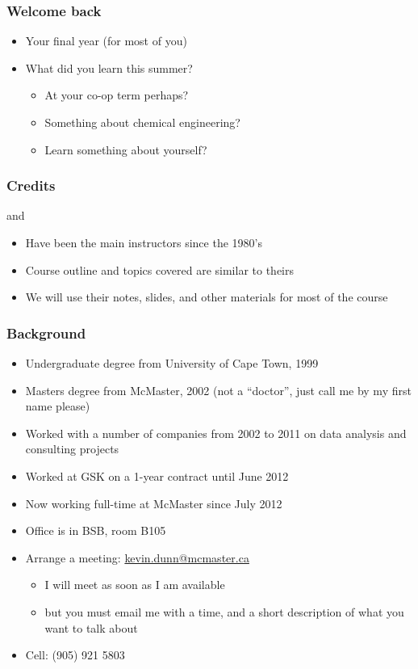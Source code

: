 
\begin{frame}\frametitle{Welcome back}
	\begin{itemize}
		\item	Your final year (for most of you)
		\item	What did you learn this summer?
			\begin{itemize}
				\item	At your co-op term perhaps?
				\item	Something about chemical engineering?
				\item	Learn something about yourself?
			\end{itemize}
	\end{itemize}
\end{frame}

\begin{frame}\frametitle{Credits}
	\begin{exampleblock}{}
		\centering {\color{myOrange}{Dr. Don Woods}} and {\color{myBlue}{Dr. Thomas Marlin}}
	\end{exampleblock}
	\begin{itemize}
		\item	Have been the main instructors since the 1980's
		\item	Course outline and topics covered are similar to theirs
		\item	We will use their notes, slides, and other materials for most of the course
	\end{itemize}
\end{frame}

\begin{frame}\frametitle{Background}
	{\color{myGreen}{About myself}}
	\begin{itemize}
		\item	Undergraduate degree from University of Cape Town, 1999
		\item	Masters degree from McMaster, 2002 (not a ``doctor'', just call me by my first name please)
		\item	Worked with a number of companies from 2002 to 2011 on data analysis and consulting projects
		\item	Worked at GSK on a 1-year contract until June 2012
		\item	Now working full-time at McMaster since July 2012
		\item	Office is in BSB, room B105
		\item	Arrange a meeting: \url{kevin.dunn@mcmaster.ca}
			\begin{itemize}
				\item	I will meet as soon as I am available
				\item	but you must email me with a time, and a short description of what you want to talk about
			\end{itemize}
		\item	Cell: (905) 921 5803
	\end{itemize}
\end{frame}

